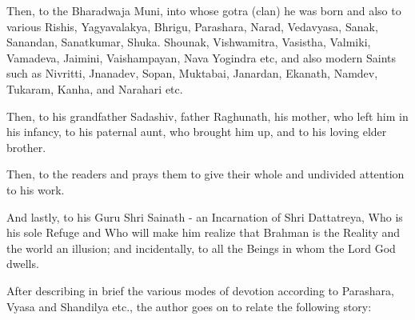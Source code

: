 Then, to the Bharadwaja Muni, into whose gotra (clan) he was born and also to various Rishis, Yagyavalakya, Bhrigu, Parashara, Narad, Vedavyasa, Sanak, Sanandan, Sanatkumar, Shuka. Shounak, Vishwamitra, Vasistha, Valmiki, Vamadeva, Jaimini, Vaishampayan, Nava Yogindra etc, and also modern Saints such as Nivritti, Jnanadev, Sopan, Muktabai, Janardan, Ekanath, Namdev, Tukaram, Kanha, and Narahari etc.

Then, to his grandfather Sadashiv, father Raghunath, his mother, who left him in his infancy, to his paternal aunt, who brought him up, and to his loving elder brother.

Then, to the readers and prays them to give their whole and undivided attention to his work.

And lastly, to his Guru Shri Sainath - an Incarnation of Shri Dattatreya, Who is his sole Refuge and Who will make him realize that Brahman is the Reality and the world an illusion; and incidentally, to all the Beings in whom the Lord God dwells.

After describing in brief the various modes of devotion according to Parashara, Vyasa and Shandilya etc., the author goes on to relate the following story:


